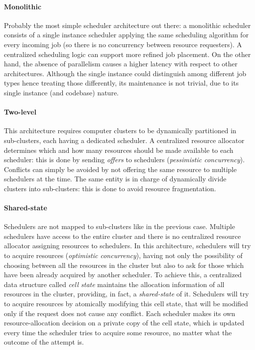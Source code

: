 \paragraph{Monolithic}
Probably the most simple scheduler architecture out there: a monolithic scheduler consists of a single instance scheduler applying the same scheduling algorithm for every incoming job (so there is no concurrency between resource requesters).
A centralized scheduling logic can support more refined job placement.
On the other hand, the absence of parallelism causes a higher latency with respect to other architectures.
Although the single instance could distinguish among different job types hence treating those differently, its maintenance is not trivial, due to its single instance (and codebase) nature.

\paragraph{Two-level}
This architecture requires computer clusters to be dynamically partitioned in sub-clusters, each having a dedicated scheduler.
A centralized resource allocator determines which and how many resources should be made available to each scheduler: this is done by sending \textit{offers} to schedulers (\textit{pessimistic concurrency}).
Conflicts can simply be avoided by not offering the same resource to multiple schedulers at the time.
The same entity is in charge of dynamically divide clusters into sub-clusters: this is done to avoid resource fragmentation.

\paragraph{Shared-state}
Schedulers are not mapped to sub-clusters like in the previous case.
Multiple schedulers have access to the entire cluster and there is no centralized resource allocator assigning resources to schedulers.
In this architecture, schedulers will try to acquire resources (\textit{optimistic concurrency}), having not only the possibility of choosing between all the resources in the cluster but also to ask for those which have been already acquired by another scheduler.
To achieve this, a centralized data structure called \textit{cell state} maintains the allocation information of all resources in the cluster, providing, in fact, a \textit{shared-state} of it.
Schedulers will try to acquire resources by atomically modifying this cell state, that will be modified only if the request does not cause any conflict.
Each scheduler makes its own resource-allocation decision on a private copy of the cell state, which is updated every time the scheduler tries to acquire some resource, no matter what the outcome of the attempt is.